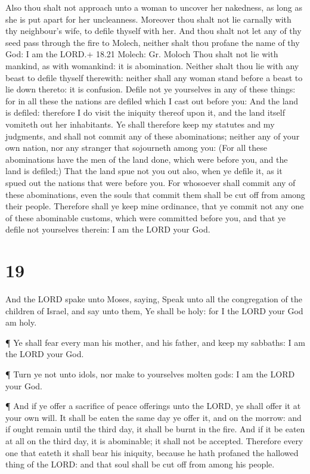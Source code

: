  Also thou shalt not approach unto a woman to uncover her
nakedness, as long as she is put apart for her uncleanness.
 Moreover thou shalt not lie carnally with thy neighbour's
wife, to defile thyself with her.  And thou shalt not let
any of thy seed pass through the fire to Molech, neither shalt thou
profane the name of thy God: I am the LORD.+ 18.21 Molech: Gr. Moloch
 Thou shalt not lie with mankind, as with womankind: it is
abomination.  Neither shalt thou lie with any beast to
defile thyself therewith: neither shall any woman stand before a beast
to lie down thereto: it is confusion.  Defile not ye
yourselves in any of these things: for in all these the nations are
defiled which I cast out before you:  And the land is
defiled: therefore I do visit the iniquity thereof upon it, and the land
itself vomiteth out her inhabitants.  Ye shall therefore
keep my statutes and my judgments, and shall not commit any of these
abominations; neither any of your own nation, nor any stranger that
sojourneth among you:  (For all these abominations have the
men of the land done, which were before you, and the land is defiled;)
 That the land spue not you out also, when ye defile it, as
it spued out the nations that were before you.  For
whosoever shall commit any of these abominations, even the souls that
commit them shall be cut off from among their people. 
Therefore shall ye keep mine ordinance, that ye commit not any one of
these abominable customs, which were committed before you, and that ye
defile not yourselves therein: I am the LORD your God.

\hypertarget{section-18}{%
\section{19}\label{section-18}}

 And the LORD spake unto Moses, saying,  Speak
unto all the congregation of the children of Israel, and say unto them,
Ye shall be holy: for I the LORD your God am holy.

 ¶ Ye shall fear every man his mother, and his father, and
keep my sabbaths: I am the LORD your God.

 ¶ Turn ye not unto idols, nor make to yourselves molten
gods: I am the LORD your God.

 ¶ And if ye offer a sacrifice of peace offerings unto the
LORD, ye shall offer it at your own will.  It shall be eaten
the same day ye offer it, and on the morrow: and if ought remain until
the third day, it shall be burnt in the fire.  And if it be
eaten at all on the third day, it is abominable; it shall not be
accepted.  Therefore every one that eateth it shall bear his
iniquity, because he hath profaned the hallowed thing of the LORD: and
that soul shall be cut off from among his people.

